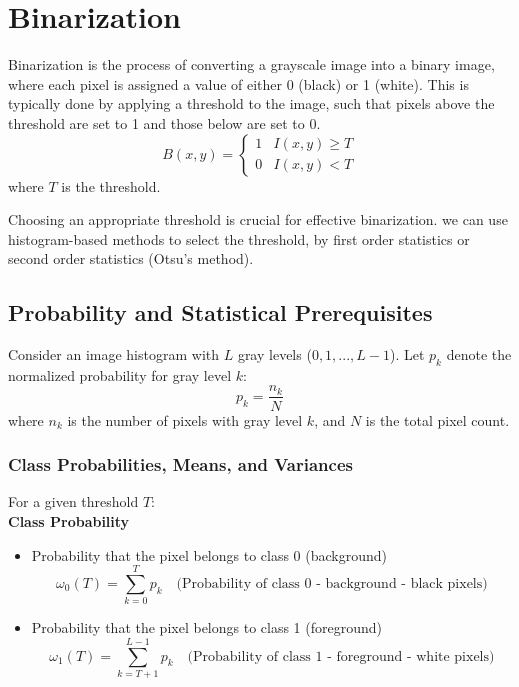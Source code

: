 \section{Binarization}

Binarization is the process of converting a grayscale image into a binary image, where each pixel is assigned a value of either 0 (black) or 1 (white). This is typically done by applying a threshold to the image, such that pixels above the threshold are set to 1 and those below are set to 0.
\[
B(x,y) = \begin{cases}
1 & I(x,y) \geq T \\
0 & I(x,y) < T
\end{cases}
\]
where $T$ is the threshold.

Choosing an appropriate threshold is crucial for effective binarization. we can use histogram-based methods to select the threshold, by first order statistics or second order statistics (Otsu's method).

\subsection{Probability and Statistical Prerequisites}


Consider an image histogram with $L$ gray levels ($0, 1, ..., L-1$). Let $p_k$ denote the normalized probability for gray level $k$:
$$
p_k = \frac{n_k}{N}
$$
where $n_k$ is the number of pixels with gray level $k$, and $N$ is the total pixel count.

\subsubsection{Class Probabilities, Means, and Variances}
For a given threshold $T$:\\
\vspace{5pt}
\noindent \textbf{Class Probability}
\begin{itemize}
\item Probability that the pixel belongs to class 0 (background)
\[
\omega_0(T) = \sum_{k=0}^T p _k \quad\text{(Probability of class 0 - background - black pixels)}
\]
\item Probability that the pixel belongs to class 1 (foreground)
\[\omega_1(T) = \sum_{k=T+1}^{L-1} p_k \quad\text{(Probability of class 1 - foreground - white pixels)} 
\]
\end{itemize}

